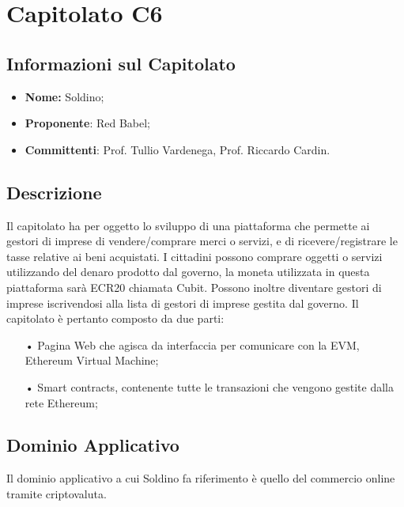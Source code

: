 \section{Capitolato C6}
\subsection{Informazioni sul Capitolato}
\begin{itemize}
	\item \textbf{Nome:} Soldino;
	\item \textbf{Proponente}: Red Babel;
	\item \textbf{Committenti}: Prof. Tullio Vardenega, Prof. Riccardo Cardin.
\end{itemize}

\subsection{Descrizione}
Il capitolato ha per oggetto lo sviluppo di una piattaforma che permette ai gestori di imprese di \newline 
vendere/comprare merci o servizi, e di ricevere/registrare le tasse relative ai beni acquistati.\newline
I cittadini possono comprare oggetti o servizi utilizzando del denaro prodotto dal governo, la moneta utilizzata in questa piattaforma sarà ECR20 chiamata Cubit. Possono inoltre diventare gestori di imprese iscrivendosi alla lista di gestori di imprese gestita dal governo.  
Il capitolato è pertanto composto da due parti: 

\begin{itemize}

\item[•] Pagina Web che agisca da interfaccia per comunicare con la EVM, Ethereum Virtual Machine;
\item[•] Smart contracts, contenente tutte le transazioni che vengono gestite dalla rete Ethereum;

\end{itemize}

\subsection{Dominio Applicativo}
Il dominio applicativo a cui Soldino fa riferimento è quello del commercio online tramite criptovaluta. 

